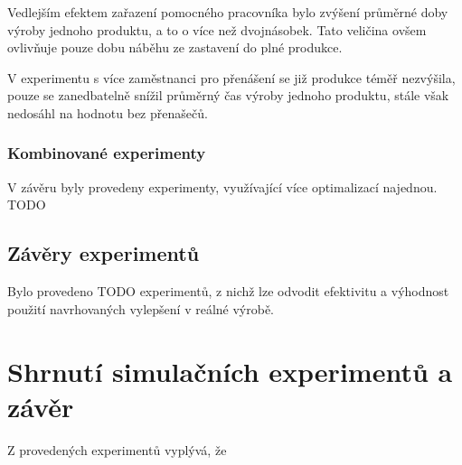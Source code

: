 \documentclass[11pt, a4paper]{article}
\begin{document}
Vedlejším efektem zařazení pomocného pracovníka bylo zvýšení průměrné doby výroby jednoho produktu, a to o více než dvojnásobek. Tato veličina ovšem ovlivňuje pouze dobu náběhu ze zastavení do plné produkce.


V experimentu s více zaměstnanci pro přenášení se již produkce téměř nezvýšila, pouze se zanedbatelně snížil průměrný čas výroby jednoho produktu, stále však nedosáhl na hodnotu bez přenašečů.

\subsubsection{Kombinované experimenty}
V závěru byly provedeny experimenty, využívající více optimalizací najednou. TODO

\subsection{Závěry experimentů}
Bylo provedeno TODO experimentů, z nichž lze odvodit efektivitu a výhodnost použití navrhovaných vylepšení v reálné výrobě.

\section{Shrnutí simulačních experimentů a závěr}
Z provedených experimentů vyplývá, že



\end{document}
